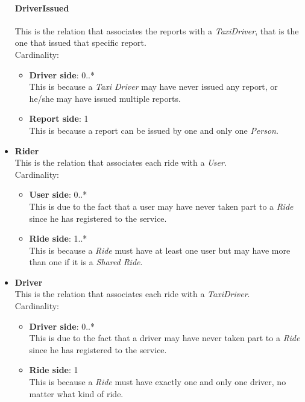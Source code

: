 \begin{itemize}
		\paragraph{DriverIssued} %
		\label{par:driverissued}
		This is the relation that associates the reports with a \emph{TaxiDriver}, that is the one that issued that specific report.\\Cardinality: 
			\begin{itemize}
				\item {\textbf{Driver side}}: 0..* \\
					This is because a \emph{Taxi Driver} may have never issued any report, or he/she may have issued multiple reports.
				\item {\textbf{Report side}}: 1 \\
					This is because a report can be issued by one and only one \emph{Person}.
			\end{itemize}

	\item {\textbf{Rider}} \\
		This is the relation that associates each ride with a \emph{User}.\\Cardinality: 
		\begin{itemize}
			\item {\textbf{User side}}: 0..* \\
				This is due to the fact that a user may have never taken part to a \emph{Ride} since he has registered to the service.
			\item {\textbf{Ride side}}: 1..* \\
				This is because a \emph{Ride} must have at least one user but may have more than one if it is a \emph{Shared Ride}.
		\end{itemize}

	\item {\textbf{Driver}} \\
		This is the relation that associates each ride with a \emph{TaxiDriver}.\\Cardinality: 
		\begin{itemize}
			\item {\textbf{Driver side}}: 0..* \\
				This is due to the fact that a driver may have never taken part to a \emph{Ride} since he has registered to the service.
			\item {\textbf{Ride side}}: 1 \\
				This is because a \emph{Ride} must have exactly one and only one driver, no matter what kind of ride.
		\end{itemize}


\end{itemize}
